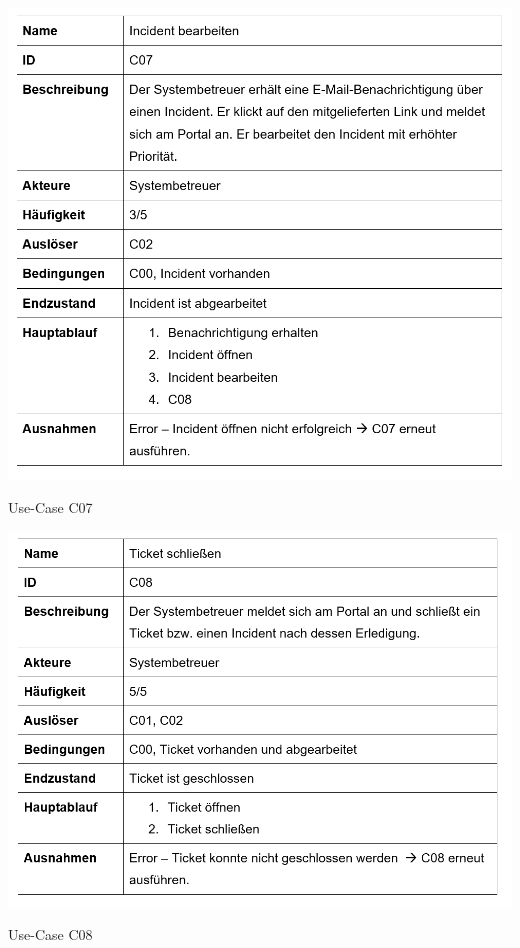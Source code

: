 \begin{table}[h]
	\centering
	\includegraphics[scale=0.62]{figures/C07.png}
	\caption{Use-Case C07}
	\label{Abb_C07}
\end{table}

\vspace{-.5cm}	
\begin{table}[h]
	\centering
	\includegraphics[scale=0.62]{figures/C08.png}
	\caption{Use-Case C08}
	\label{Abb_C08}
\end{table}

